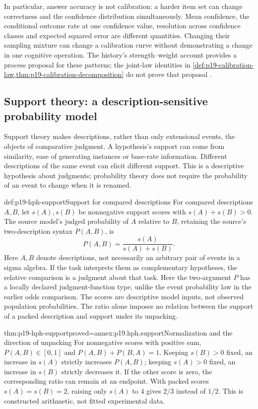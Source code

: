 In particular, answer accuracy is not calibration: a harder item set
can change correctness and the confidence distribution simultaneously.
Mean confidence, the conditional outcome rate at one confidence value,
resolution across confidence classes and expected squared error are
different quantities. Changing their sampling mixture can change a
calibration curve without demonstrating a change in one cognitive
operation. The history's strength--weight account provides a process
proposal for these patterns; the joint-law identities in
\cref{def:p19-calibration-law,thm:p19-calibration-decomposition}
do not prove that proposal
\cite[pp.~334, 338]{GriffinEtAl2012HeuristicsHistory}.

\subsection{Support theory: a description-sensitive probability model}

Support theory makes descriptions, rather than only extensional events,
the objects of comparative judgment. A hypothesis's support can come
from similarity, ease of generating instances or base-rate information.
Different descriptions of the same event can elicit different support.
This is a descriptive hypothesis about judgments; probability theory
does not require the probability of an event to change when it is renamed.

\begin{hbdefinition}{def:p19-hph-support}{Support for compared descriptions}
For compared descriptions \(A,B\), let \(s(A),s(B)\) be nonnegative
support scores with \(s(A)+s(B)>0\). The source model's judged
probability of \(A\) relative to \(B\), retaining the source's
two-description syntax \(P(A,B)\), is
\[
             P(A,B)=\frac{s(A)}{s(A)+s(B)}.
\]
Here \(A,B\) denote descriptions, not necessarily an arbitrary pair of
events in a sigma algebra. If the task interprets them as complementary
hypotheses, the relative comparison is a judgment about that task.
Here the two-argument \(P\) has a locally declared judgment-function
type, unlike the event probability law in the earlier odds comparison.
The scores are descriptive model inputs, not observed population
probabilities. The ratio alone imposes no relation between the support
of a packed description and support under its unpacking.
\end{hbdefinition}

\begin{hblemma}{thm:p19-hph-support}{proved=annex:p19.hph.support}{Normalization and the direction of unpacking}
For nonnegative scores with positive sum, \(P(A,B)\in[0,1]\) and
\(P(A,B)+P(B,A)=1\). Keeping \(s(B)>0\) fixed, an increase
in \(s(A)\) strictly increases \(P(A,B)\); keeping \(s(A)>0\)
fixed, an increase in \(s(B)\) strictly decreases it. If the other
score is zero, the corresponding ratio can remain at an endpoint.
With packed scores \(s(A)=s(B)=2\), raising only \(s(A)\) to 4
gives \(2/3\) instead of \(1/2\). This is constructed arithmetic,
not fitted experimental data.
\end{hblemma}

